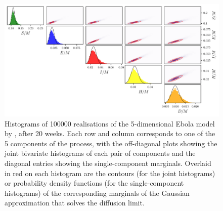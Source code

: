 \begin{landscape}
	\begin{figure}
		\centering
		\includegraphics[width=1.3\textheight]{chp07_outlook/figures/seihfr/seihfr_marginals_gaussian}
		\caption{Histograms of 100000 realisations of the 5-dimensional Ebola model by \citet{LegrandEtAl_2007_UnderstandingDynamicsEbola}, after 20 weeks.
			Each row and column corresponds to one of the 5 components of the process, with the off-diagonal plots showing the joint bivariate histograms of each pair of components and the diagonal entries showing the single-component marginals.
			Overlaid in red on each histogram are the contours (for the joint histograms) or probability density functions (for the single-component histograms) of the corresponding marginals of the Gaussian approximation that solves the diffusion limit.}
		\label{fig:ebola_marginals}
	\end{figure}
\end{landscape}



